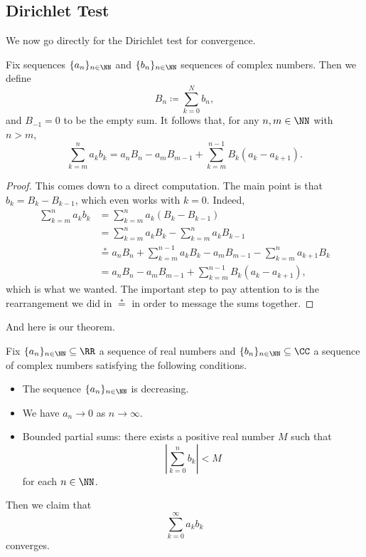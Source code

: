 \documentclass[../notes.tex]{subfiles}
\begin{document}
\subsection{Dirichlet Test}
We now go directly for the Dirichlet test for convergence.
\begin{lemma} \label{lem:sumparts}
	Fix sequences $\{a_n\}_{n\in\NN}$ and $\{b_n\}_{n\in\NN}$ sequences of complex numbers. Then we define
	\[B_n\coloneqq \sum_{k=0}^Nb_n,\]
	and $B_{-1}=0$ to be the empty sum. It follows that, for any $n,m\in\NN$ with $n>m$,
	\[\sum_{k=m}^na_kb_k=a_nB_n-a_mB_{m-1}+\sum_{k=m}^{n-1}B_k(a_k-a_{k+1}).\]
\end{lemma}
\begin{proof}
	This comes down to a direct computation. The main point is that $b_k=B_k-B_{k-1}$, which even works with $k=0$. Indeed,
	\begin{align*}
		\sum_{k=m}^na_kb_k &= \sum_{k=m}^na_k(B_k-B_{k-1}) \\
		&= \sum_{k=m}^na_kB_k-\sum_{k=m}^na_kB_{k-1} \\
		&\stackrel*= a_nB_n+\sum_{k=m}^{n-1}a_kB_k-a_mB_{m-1}-\sum_{k=m}^na_{k+1}B_k \\
		&= a_nB_n-a_mB_{m-1}+\sum_{k=m}^{n-1}B_k(a_k-a_{k+1}),
	\end{align*}
	which is what we wanted. The important step to pay attention to is the rearrangement we did in $\stackrel*=$ in order to message the sums together.
\end{proof}
And here is our theorem.
\begin{theorem}
	Fix $\{a_n\}_{n\in\NN}\subseteq\RR$ a sequence of real numbers and $\{b_n\}_{n\in\NN}\subseteq\CC$ a sequence of complex numbers satisfying the following conditions.
	\begin{itemize}
		\item The sequence $\{a_n\}_{n\in\NN}$ is decreasing.
		\item We have $a_n\to0$ as $n\to\infty$.
		\item Bounded partial sums: there exists a positive real number $M$ such that
		\[\left|\sum_{k=0}^nb_k\right|<M\]
		for each $n\in\NN$.
	\end{itemize}
	Then we claim that
	\[\sum_{k=0}^\infty a_kb_k\]
	converges.
\end{theorem}
\end{document}
